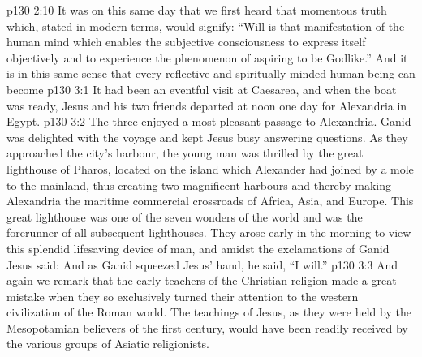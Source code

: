 \vs p130 2:10 \pc It was on this same day that we first heard that momentous truth which, stated in modern terms, would signify: “Will is that manifestation of the human mind which enables the subjective consciousness to express itself objectively and to experience the phenomenon of aspiring to be Godlike.” And it is in this same sense that every reflective and spiritually minded human being can become 
\vs p130 3:1 It had been an eventful visit at Caesarea, and when the boat was ready, Jesus and his two friends departed at noon one day for Alexandria in Egypt.
\vs p130 3:2 The three enjoyed a most pleasant passage to Alexandria. Ganid was delighted with the voyage and kept Jesus busy answering questions. As they approached the city’s harbour, the young man was thrilled by the great lighthouse of Pharos, located on the island which Alexander had joined by a mole to the mainland, thus creating two magnificent harbours and thereby making Alexandria the maritime commercial crossroads of Africa, Asia, and Europe. This great lighthouse was one of the seven wonders of the world and was the forerunner of all subsequent lighthouses. They arose early in the morning to view this splendid lifesaving device of man, and amidst the exclamations of Ganid Jesus said:  And as Ganid squeezed Jesus’ hand, he said, “I will.”
\vs p130 3:3 \pc And again we remark that the early teachers of the Christian religion made a great mistake when they so exclusively turned their attention to the western civilization of the Roman world. The teachings of Jesus, as they were held by the Mesopotamian believers of the first century, would have been readily received by the various groups of Asiatic religionists.
